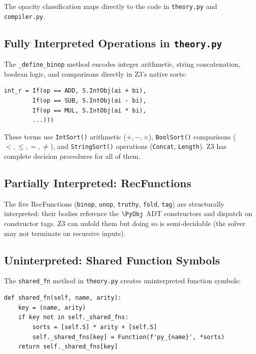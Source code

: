 The opacity classification maps directly to the code in
\texttt{theory.py} and \texttt{compiler.py}.

\subsection{Fully Interpreted Operations in \texttt{theory.py}}

The \texttt{\_define\_binop} method encodes integer arithmetic,
string concatenation, boolean logic, and comparisons directly
in Z3's native sorts:

\begin{lstlisting}[caption={Fully interpreted: arithmetic (theory.py)}]
int_r = If(op == ADD, S.IntObj(ai + bi),
        If(op == SUB, S.IntObj(ai - bi),
        If(op == MUL, S.IntObj(ai * bi),
        ...)))
\end{lstlisting}

These terms use \texttt{IntSort()} arithmetic ($+, -, \times$),
\texttt{BoolSort()} comparisons ($<, \leq, =, \neq$), and
\texttt{StringSort()} operations (\texttt{Concat}, \texttt{Length}).
Z3 has complete decision procedures for all of them.

\subsection{Partially Interpreted: RecFunctions}

The five RecFunctions (\texttt{binop}, \texttt{unop}, \texttt{truthy},
\texttt{fold}, \texttt{tag}) are structurally interpreted: their
bodies reference the $\PyObj$ ADT constructors and dispatch on
constructor tags.  Z3 can unfold them but doing so is
semi-decidable (the solver may not terminate on recursive inputs).

\subsection{Uninterpreted: Shared Function Symbols}

The \texttt{shared\_fn} method in \texttt{theory.py} creates
uninterpreted function symbols:

\begin{lstlisting}[caption={Uninterpreted shared symbols (theory.py)}]
def shared_fn(self, name, arity):
    key = (name, arity)
    if key not in self._shared_fns:
        sorts = [self.S] * arity + [self.S]
        self._shared_fns[key] = Function(f'py_{name}', *sorts)
    return self._shared_fns[key]
\end{lstlisting}

